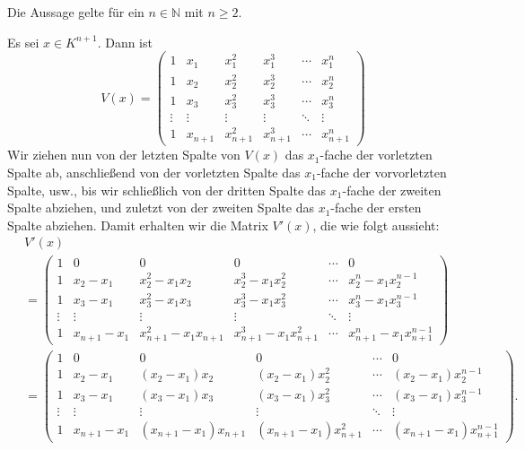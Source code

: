 \documentclass[a4paper,10pt]{article}
\begin{document}
\begin{iv}
 Die Aussage gelte für ein $n \in \mathbb{N}$ mit $n \geq 2$.
\end{iv}

\begin{is}
 Es sei $x \in K^{n+1}$. Dann ist
 \[
  V(x) =
  \begin{pmatrix}
   1      & x_1     & x_1^2     & x_1^3     & \cdots & x_1^n     \\
   1      & x_2     & x_2^2     & x_2^3     & \cdots & x_2^n     \\
   1      & x_3     & x_3^2     & x_3^3     & \cdots & x_3^n     \\
   \vdots & \vdots  & \vdots    & \vdots    & \ddots & \vdots    \\
   1      & x_{n+1} & x_{n+1}^2 & x_{n+1}^3 & \cdots & x_{n+1}^n
  \end{pmatrix}
 \]
 Wir ziehen nun von der letzten Spalte von $V(x)$ das $x_1$-fache der vorletzten Spalte ab, anschließend von der vorletzten Spalte das $x_1$-fache der vorvorletzten Spalte, usw., bis wir schließlich von der dritten Spalte das $x_1$-fache der zweiten Spalte abziehen, und zuletzt von der zweiten Spalte das $x_1$-fache der ersten Spalte abziehen. Damit erhalten wir die Matrix $V'(x)$, die wie folgt aussieht:
 \begin{align*}
  &\, V'(x) \\
  &\,=
  \begin{pmatrix}
   1      & 0           & 0                     & 0                       & \cdots & 0                     \\
   1      & x_2 - x_1   & x_2^2 - x_1 x_2       & x_2^3 - x_1 x_2^2       & \cdots & x_2^n - x_1 x_2^{n-1} \\
   1      & x_3 - x_1   & x_3^2 - x_1 x_3       & x_3^3 - x_1 x_3^2       & \cdots & x_3^n - x_1 x_3^{n-1} \\
   \vdots & \vdots      & \vdots                & \vdots                  & \ddots & \vdots                \\
   1      & x_{n+1}-x_1 & x_{n+1}^2-x_1 x_{n+1} & x_{n+1}^3-x_1 x_{n+1}^2 & \cdots & x_{n+1}^n-x_1 x_{n+1}^{n-1}
  \end{pmatrix} \\
  &\,=
  \begin{pmatrix}
   1      & 0           & 0                    & 0                      & \cdots & 0                     \\
   1      & x_2 - x_1   & (x_2 - x_1)x_2       & (x_2 - x_1)x_2^2       & \cdots & (x_2 - x_1)x_2^{n-1}  \\
   1      & x_3 - x_1   & (x_3 - x_1)x_3       & (x_3 - x_1)x_3^2       & \cdots & (x_3 - x_1)x_3^{n-1}  \\
   \vdots & \vdots      & \vdots               & \vdots                 & \ddots & \vdots                \\
   1      & x_{n+1}-x_1 & (x_{n+1}-x_1)x_{n+1} & (x_{n+1}-x_1)x_{n+1}^2 & \cdots & (x_{n+1}-x_1)x_{n+1}^{n-1}
  \end{pmatrix}.
 \end{align*}
\end{is}
\end{document}
